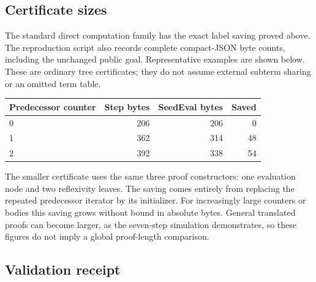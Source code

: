 \documentclass[11pt,letterpaper]{article}
\begin{document}
\subsection{Certificate sizes}

The standard direct computation family has the exact label saving proved
above. The reproduction script also records complete compact-JSON byte
counts, including the unchanged public goal. Representative examples are
shown below. These are ordinary tree certificates; they do not assume
external subterm sharing or an omitted term table.

\begin{center}
\small
\begin{tabularx}{\linewidth}{@{}Xrrr@{}}
\toprule
Predecessor counter & Step bytes & SeedEval bytes & Saved\\
\midrule
0 & 206 & 206 & 0\\
1 & 362 & 314 & 48\\
2 & 392 & 338 & 54\\
\bottomrule
\end{tabularx}
\end{center}

The smaller certificate uses the same three proof constructors: one
evaluation node and two reflexivity leaves. The saving comes entirely
from replacing the repeated predecessor iterator by its initializer.
For increasingly large counters or bodies this saving grows without
bound in absolute bytes. General translated proofs can become larger,
as the seven-step simulation demonstrates, so these figures do not imply
a global proof-length comparison.

\subsection{Validation receipt}
\end{document}
